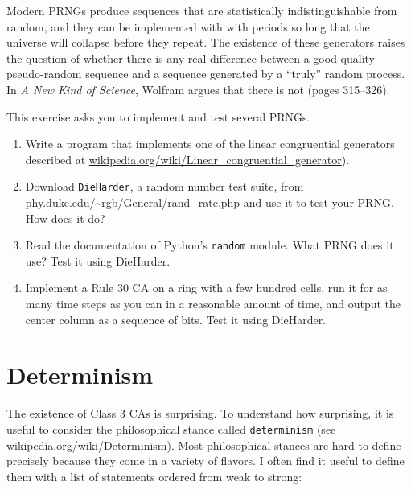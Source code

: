 \documentclass[10pt]{book}
\begin{document}
Modern PRNGs produce sequences that are statistically
indistinguishable from random, and they can be implemented with with
periods so long that the universe will collapse before they repeat.
The existence of these generators raises the question of whether there
is any real difference between a good quality pseudo-random sequence
and a sequence generated by a ``truly'' random process.  In {\em A New
  Kind of Science}, Wolfram argues that there is not (pages 315--326).

\begin{ex}

This exercise asks you to implement and test several PRNGs.

\begin{enumerate}

\item Write a program that implements one of the linear congruential
generators described at
\url{wikipedia.org/wiki/Linear_congruential_generator}).

\item Download {\tt DieHarder}, a random number test suite, from
\url{phy.duke.edu/~rgb/General/rand_rate.php} and use it to
test your PRNG.  How does it do?

\item Read the documentation of Python's {\tt random} module.
What PRNG does it use?  Test it using DieHarder.

\item Implement a Rule 30 CA on a ring with a few hundred cells,
run it for as many time steps as you can in a reasonable amount
of time, and output the center column as a sequence of bits.
Test it using DieHarder.

\end{enumerate}

\end{ex}


\section{Determinism}

The existence of Class 3 CAs is surprising.  To understand how
surprising, it is useful to consider the philosophical stance called
{\tt determinism} (see \url{wikipedia.org/wiki/Determinism}).
Most philosophical stances are hard to define precisely because
they come in a variety of flavors.  I often find it useful
to define them with a list of statements ordered from weak
to strong:
\end{document}

